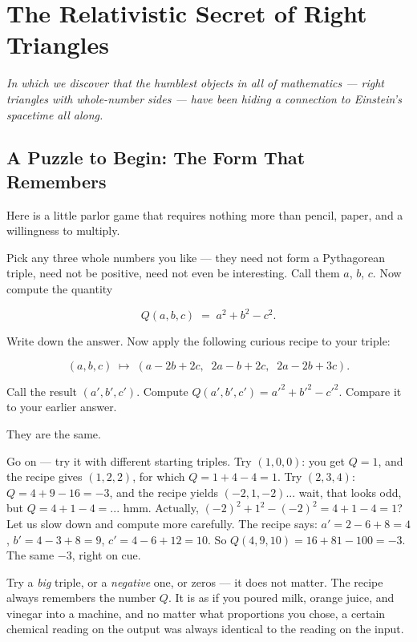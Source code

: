 \chapter{The Relativistic Secret of Right Triangles}


\textit{In which we discover that the humblest objects in all of mathematics --- right triangles with whole-number sides --- have been hiding a connection to Einstein's spacetime all along.}


\ornbreak



\section{A Puzzle to Begin: The Form That Remembers}


Here is a little parlor game that requires nothing more than pencil, paper, and a willingness to multiply.

Pick any three whole numbers you like --- they need not form a Pythagorean triple, need not be positive, need not even be interesting. Call them $a$, $b$, $c$. Now compute the quantity

\[
Q(a, b, c) \;=\; a^2 + b^2 - c^2.
\]

Write down the answer. Now apply the following curious recipe to your triple:

\[
(a, b, c) \;\longmapsto\; (a - 2b + 2c,\;\; 2a - b + 2c,\;\; 2a - 2b + 3c).
\]

Call the result $(a', b', c')$. Compute $Q(a', b', c') = a'^2 + b'^2 - c'^2$. Compare it to your earlier answer.

They are the same.

Go on --- try it with different starting triples. Try $(1, 0, 0)$: you get $Q = 1$, and the recipe gives $(1, 2, 2)$, for which $Q = 1 + 4 - 4 = 1$. Try $(2, 3, 4)$: $Q = 4 + 9 - 16 = -3$, and the recipe yields $(-2, 1, -2)$... wait, that looks odd, but $Q = 4 + 1 - 4 = ... $ hmm. Actually, $(-2)^2 + 1^2 - (-2)^2 = 4 + 1 - 4 = 1$? Let us slow down and compute more carefully. The recipe says: $a' = 2 - 6 + 8 = 4$, $b' = 4 - 3 + 8 = 9$, $c' = 4 - 6 + 12 = 10$. So $Q(4, 9, 10) = 16 + 81 - 100 = -3$. The same $-3$, right on cue.

Try a \textit{big} triple, or a \textit{negative} one, or zeros --- it does not matter. The recipe always remembers the number $Q$. It is as if you poured milk, orange juice, and vinegar into a machine, and no matter what proportions you chose, a certain chemical reading on the output was always identical to the reading on the input.

